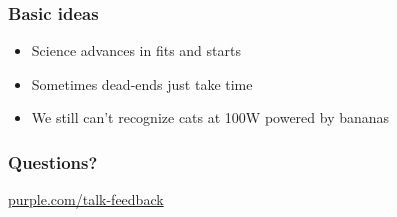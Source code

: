\begin{frame}
  \frametitle{Basic ideas}
  \begin{itemize}
  \item Science advances in fits and starts
  \item Sometimes dead-ends just take time
  \item We still can't recognize cats at 100W powered by bananas
  \end{itemize}
\end{frame}



\begin{frame}
  \frametitle{Questions?}
  \centerline{\large\url{purple.com/talk-feedback}}
\end{frame}



